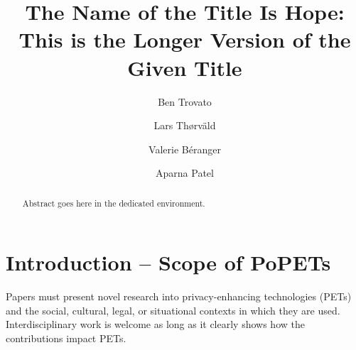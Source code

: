 \documentclass[sigconf,anonymous,review]{acmart}
\begin{document}
\title[The Name of the Title Is Hope]{The Name of the Title Is Hope: This is the Longer Version of the Given Title}

\author{Ben Trovato}

\author{Lars Th{\o}rv{\"a}ld}

\author{Valerie B\'eranger}

\author{Aparna Patel}

\renewcommand{\shortauthors}{Trovato et al.}

\begin{abstract}
  Abstract goes here in the dedicated environment.
\end{abstract}


\maketitle

\section{Introduction -- Scope of PoPETs}

Papers must present novel research into privacy-enhancing technologies (PETs)
and the social, cultural, legal, or situational contexts in which they are used.
Interdisciplinary work is welcome as long as it clearly shows how the
contributions impact PETs.
\end{document}
